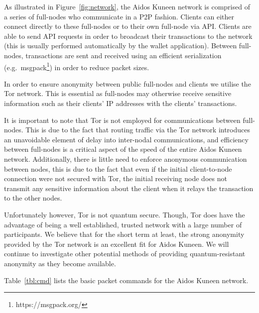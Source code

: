 \documentclass[a4paper,10pt,twocolumn]{article}
\begin{document}
As illustrated in Figure~\ref{fig:network}, the Aidos Kuneen network is comprised of a series of full-nodes who communicate in a P2P fashion. 
Clients can either connect directly to these full-nodes or to their own full-node via API\@. Clients are able to send API requests in order to broadcast their transactions to the network (this is usually performed automatically
by the wallet application). Between full-nodes, transactions are sent and received using an efficient serialization (e.g.\ msgpack\footnote{https://msgpack.org/}) in order to reduce packet sizes.

In order to ensure anonymity between public full-nodes and clients we utilise the Tor network. This is essential as full-nodes
may otherwise receive sensitive information such as their clients' IP addresses with the clients' transactions.  

It is important to note that Tor is not employed for communications between full-nodes. This is due to the fact that routing traffic via the Tor network introduces an unavoidable element of delay into inter-nodal communications, and efficiency between full-nodes 
is a critical aspect of the speed of the entire Aidos Kuneen network. Additionally, there is little need to enforce anonymous communication between nodes, this is due to the fact that even if the initial client-to-node connection were not secured with Tor, the initial receiving node 
does not transmit any sensitive information about the client when it relays the transaction to the other nodes.

Unfortunately however, Tor is not quantum secure. Though, Tor does have the advantage of being a well established, trusted network with a large number of participants. We believe that for the short term at least, the strong anonymity provided 
by the Tor network is an excellent fit for Aidos Kuneen. We will continue to investigate other potential methods of providing quantum-resistant anonymity as they become available. 

Table~\ref{tbl:cmd} lists the basic packet commands for the Aidos Kuneen network.

\end{document}
